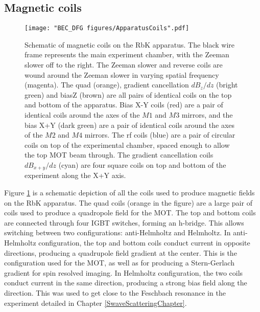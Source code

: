 \subsection{Magnetic coils}\label{sec:magneticCoils}
\begin{figure}
	\texttt{[image: "BEC\_DFG figures/ApparatusCoils".pdf]}
\caption{Schematic of magnetic coils on the RbK apparatus. The black wire frame represents the main experiment chamber, with the Zeeman slower off to the right. The Zeeman slower and reverse coils are wound around the Zeeman slower in varying spatial frequency (magenta). The quad (orange), gradient cancellation $dB_z/dz$ (bright green) and biasZ (brown) are all pairs of identical coils on the top and bottom of the apparatus. Bias X-Y coils (red) are a pair of identical coils around the axes of the $M1$ and $M3$ mirrors, and the bias X+Y (dark green) are a pair of identical coils around the axes of the $M2$ and $M4$ mirrors. The rf coils (blue) are a pair of circular coils on top of the experimental chamber, spaced enough to allow the top MOT beam through. The gradient cancellation coils $dB_{x+y}/dz$ (cyan) are four square coils on top and bottom of the experiment along the X+Y axis. }
\label{fig:ApparatusCoils}
\end{figure}

Figure \ref{fig:ApparatusCoils} is a schematic depiction of all the coils used to produce magnetic fields on the RbK apparatus. The quad coils (orange in the figure) are a large pair of coils used to produce a quadropole field for the MOT. The top and bottom coils are connected through four IGBT switches, forming an h-bridge. This allows switching between two configurations: anti-Helmholtz and Helmholtz. In anti-Helmholtz configuration, the top and bottom coils conduct current in opposite directions, producing a quadrupole field gradient at the center. This is the configuration used for the MOT, as well as for producing a Stern-Gerlach gradient for spin resolved imaging. In Helmholtz configuration, the two coils conduct current in the same direction, producing a strong bias field along the \ez{} direction. This was used to get close to the Feschbach resonance in the experiment detailed in Chapter \ref{SwaveScatteringChapter}. 

